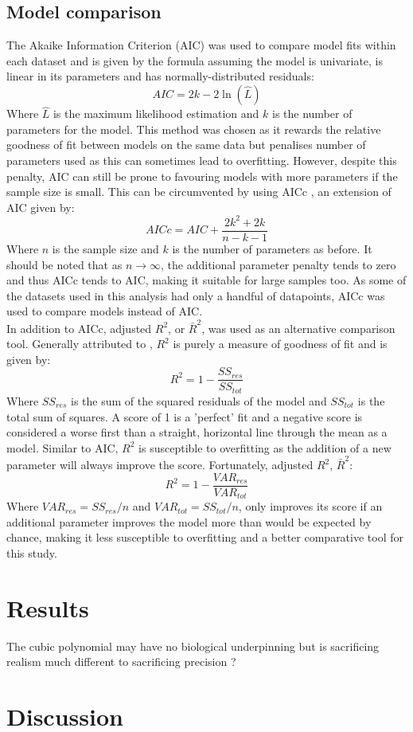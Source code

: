 \documentclass[twoside,twocolumn]{article}
\begin{document}
\subsection{Model comparison}
The Akaike Information Criterion (AIC) \citep{A1974} was used to compare model fits within each dataset and is given by the formula assuming the 
model is univariate, is linear in its parameters and has normally-distributed residuals:
\begin{equation}
  AIC = 2k - 2\ln(\hat{L})
\end{equation}
Where $\hat{L}$ is the maximum likelihood estimation and $k$ is the number of parameters for the model.
This method was chosen as it rewards the relative goodness of fit between models on the same data but penalises number of parameters used 
as this can sometimes lead to overfitting. However, despite this penalty, AIC can still be prone to favouring models with more parameters if 
the sample size is small. This can be circumvented by using AICc \citep{Hurvich1989}, an extension of AIC given by:
\begin{equation}
  AICc = AIC + \frac{2k^2 + 2k}{n-k-1}
\end{equation}
Where $n$ is the sample size and $k$ is the number of parameters as before. It should be noted that as $n \to \infty$, the additional parameter
penalty tends to zero and thus AICc tends to AIC, making it suitable for large samples too. As some of the datasets used in this analysis had only a handful of datapoints,
AICc was used to compare models instead of AIC.
\\
In addition to AICc, adjusted $R^2$, or $\bar{R}^2$, was used as an alternative comparison tool. Generally attributed to \cite{Wright1921}, 
$R^2$ is purely a measure of goodness of fit and is given by:
\begin{equation}
  R^2 = 1 - \frac{SS_{res}}{SS_{tot}}
\end{equation}
Where $SS_{res}$ is the sum of the squared residuals of the model and $SS_{tot}$ is the total sum of squares. A score of 1 is a 'perfect' fit
and a negative score is considered a worse first than a straight, horizontal line through the mean as a model. Similar to AIC, $R^2$ is susceptible
to overfitting as the addition of a new parameter will always improve the score. Fortunately, adjusted $R^2$, $\bar{R}^2$:
\begin{equation}
  R^2 = 1 - \frac{VAR_{res}}{VAR_{tot}}
\end{equation}
Where $VAR_{res} = SS_{res}/n$ and $VAR_{tot} = SS_{tot}/n$, only improves its score if an additional parameter improves the model more than would
be expected by chance, making it less susceptible to overfitting and a better comparative tool for this study.


\section{Results}
The cubic polynomial may have no biological underpinning but is sacrificing realism much different to sacrificing precision \citep{Levins1966}?





\section{Discussion}





\end{document}
